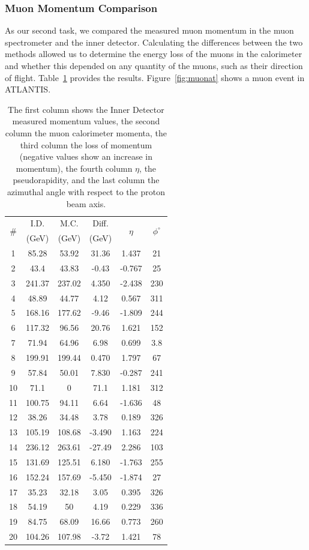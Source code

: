 \documentclass[twocolumn]{article}
\begin{document}
\subsubsection{Muon Momentum Comparison}
As our second task, we compared the measured muon momentum in the muon spectrometer and the inner detector. Calculating the differences between the two methods allowed us to determine the energy loss of the muons in the calorimeter and whether this depended on any quantity of the muons, such as their direction of flight. Table~\ref{tab:muon} provides the results. Figure~\ref{fig:muonat} shows a muon event in ATLANTIS.
\begin{table} [!h]
\centering
\begin{tabular}{|c|c|c|c|c|c|}
\hline
\multirow{2}{*}{\#} 	& I.D.		& M.C. 		& Diff. 	& \multirow{2}{*}{$\eta$} & \multirow{2}{*}{$\phi^{\circ}$}\\
					& (GeV)	& (GeV)	& (GeV)	&	&\\
\hline
1&	85.28&		53.92&		31.36&		1.437&	21\\\hline
2&	43.4&		43.83&		-0.43&		-0.767&	25\\\hline
3&	241.37&		237.02&		4.350&		-2.438&	230\\\hline
4&	48.89&		44.77&		4.12&		0.567&	311\\\hline
5&	168.16&		177.62&		-9.46&		-1.809&	244\\\hline
6&	117.32&		96.56&		20.76&		1.621&	152\\\hline
7&	71.94&		64.96&		6.98&		0.699&	3.8\\\hline
8&	199.91&		199.44&		0.470&		1.797&	67\\\hline
9&	57.84&		50.01&		7.830&		-0.287&	241\\\hline
10&	71.1&		0&			71.1&		1.181&	312\\\hline
11&	100.75&		94.11&		6.64&		-1.636&	48\\\hline
12&	38.26&		34.48&		3.78&		0.189&	326\\\hline
13&	105.19&		108.68&		-3.490&		1.163&	224\\\hline
14&	236.12&		263.61&		-27.49&		2.286&	103\\\hline
15&	131.69&		125.51&		6.180&		-1.763&	255\\\hline
16&	152.24&		157.69&		-5.450&		-1.874&	27\\\hline
17&	35.23&		32.18&		3.05&		0.395&	326\\\hline
18&	54.19&		50&			4.19&		0.229&	336\\\hline
19&	84.75&		68.09&		16.66&		0.773&	260\\\hline
20&	104.26&		107.98&		-3.72&		1.421&	78\\
\hline
\end{tabular}
\caption{The first column shows the Inner Detector measured momentum values, the second column the muon calorimeter momenta, the third column the loss of momentum (negative values show an increase in momentum), the fourth column $\eta$, the pseudorapidity, and the last column the azimuthal angle with respect to the proton beam axis.}
\label{tab:muon}
\end{table}
\end{document}
